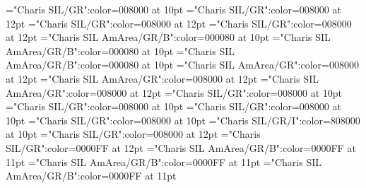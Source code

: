 \documentclass[a4paper,twoside]{article}
\begin{document}
\font{}="Charis SIL/GR":color=008000 at 10pt
\font\examplescontentssensesensecontentsensesentryletDatadicBody="Charis SIL/GR":color=008000 at 12pt
\font\examplescontentexamplescontentssensesensecontentsensesentryletDatadicBody="Charis SIL/GR":color=008000 at 12pt
\font\exampleexamplescontentexamplescontentssensesensecontentsensesentryletDatadicBody="Charis SIL/GR":color=008000 at 12pt
\font\spanmxbexampleexamplescontentexamplescontentssensesensecontentsensesentryletDatadicBody="Charis SIL AmArea/GR/B":color=000080 at 10pt
\font\spanspanmxbexampleexamplescontentexamplescontentssensesensecontentsensesentryletDatadicBody="Charis SIL AmArea/GR/B":color=000080 at 10pt
\font\spanexampleexamplescontentexamplescontentssensesensecontentsensesentryletDatadicBody="Charis SIL AmArea/GR/B":color=000080 at 10pt
\font\translationcontentsexamplescontentexamplescontentssensesensecontentsensesentryletDatadicBody="Charis SIL AmArea/GR":color=008000 at 12pt
\font\translationcontenttranslationcontentsexamplescontentexamplescontentssensesensecontentsensesentryletDatadicBody="Charis SIL AmArea/GR":color=008000 at 12pt
\font\translationtranslationcontenttranslationcontentsexamplescontentexamplescontentssensesensecontentsensesentryletDatadicBody="Charis SIL AmArea/GR":color=008000 at 12pt
\font\spanestranslationtranslationcontenttranslationcontentsexamplescontentexamplescontentssensesensecontentsensesentryletDatadicBody="Charis SIL/GR":color=008000 at 10pt
\font\spanspanestranslationtranslationcontenttranslationcontentsexamplescontentexamplescontentssensesensecontentsensesentryletDatadicBody="Charis SIL/GR":color=008000 at 10pt
\font\spantranslationtranslationcontenttranslationcontentsexamplescontentexamplescontentssensesensecontentsensesentryletDatadicBody="Charis SIL/GR":color=008000 at 10pt
\font\spanesspanestranslationtranslationcontenttranslationcontentsexamplescontentexamplescontentssensesensecontentsensesentryletDatadicBody="Charis SIL/GR":color=008000 at 10pt
\font\translationstesspanestranslationtranslationcontenttranslationcontentsexamplescontentexamplescontentssensesensecontentsensesentryletDatadicBody="Charis SIL/GR/I":color=808000 at 10pt
\font\minorentryvariantletDatadicBody="Charis SIL/GR":color=008000 at 12pt
\font\headwordminorentryvariantletDatadicBody="Charis SIL/GR":color=0000FF at 12pt
\font\spanmxbheadwordminorentryvariantletDatadicBody="Charis SIL AmArea/GR/B":color=0000FF at 11pt
\font\aspanmxbheadwordminorentryvariantletDatadicBody="Charis SIL AmArea/GR/B":color=0000FF at 11pt
\font\spanheadwordminorentryvariantletDatadicBody="Charis SIL AmArea/GR/B":color=0000FF at 11pt
\end{document}
